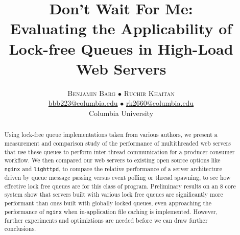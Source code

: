 \documentclass[twoside,10pt]{article}
\title{\vspace{-15mm}%
  \fontsize{24pt}{10pt}\selectfont \textbf{Don't Wait For Me:}\\
  \textbf{Evaluating the Applicability of Lock-free Queues in High-Load Web
    Servers} }
\author{%
  \large
  \textsc{Benjamin Barg $\bullet$ Ruchir Khaitan}\\[2mm]
  \normalsize \href{mailto:bbb2123@columbia.edu}{bbb223@columbia.edu}
    $\bullet$ \href{mailto:rk2660@columbia.edu}{rk2660@columbia.edu}\\
  \normalsize	Columbia University
  \vspace{-5mm} }
\date{}
\begin{document}
\maketitle
\thispagestyle{fancy}

\begin{abstract}
  \noindent Using lock-free queue implementations taken from various
  authors, we present a measurement and comparison study of the
  performance of multithreaded web servers that use these queues to
  perform inter-thread communication for a producer-consumer
  workflow. We then compared our web servers to existing open source
  options like \verb+nginx+ and \verb+lighttpd+, to compare the
  relative performance of a server architecture driven by queue
  message passing versus event polling or thread spawning, to see how
  effective lock free queues are for this class of
  program. Preliminary results on an 8 core system show that servers
  built with various lock free queues are significantly more
  performant than ones built with globally locked queues, even
  approaching the performance of \verb+nginx+ when in-application file
  caching is implemented. However, further experiments and
  optimiztions are needed before we can draw further conclusions.
\end{abstract}
\end{document}
